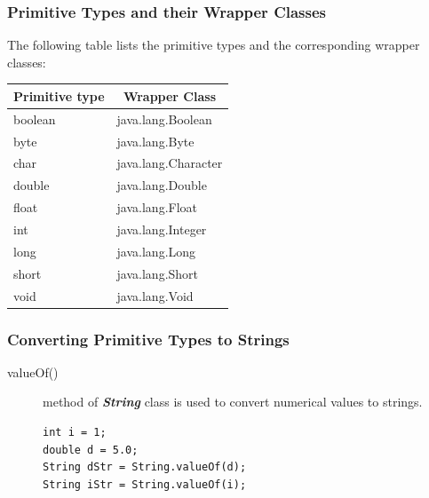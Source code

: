 \documentclass[11pt,a4paper]{article}
\begin{document}
\subsubsection*{Primitive Types and their Wrapper Classes}
The following table lists the primitive types and the corresponding wrapper classes:

\begin{table}[H]
\centering
\begin{tabular}{|p{3 cm}|p{5.5 cm}|}  \hline

\multicolumn{1}{|c|}{\textbf{Primitive type} } & \multicolumn{1}{|c|}{\textbf{Wrapper Class}} \\\hline
boolean & java.lang.Boolean \\ \hline
byte & java.lang.Byte \\ \hline
char & java.lang.Character \\ \hline
double & java.lang.Double \\ \hline
float & java.lang.Float \\ \hline
int & java.lang.Integer \\ \hline
long & java.lang.Long \\ \hline
short & java.lang.Short \\ \hline
void & java.lang.Void \\ \hline
 \end{tabular}
\end{table}


\subsubsection*{Converting Primitive Types to Strings}
\begin{description}
\item [valueOf()] method of \emph{\textbf{String}} class is used to convert numerical values to strings.
\begin{lstlisting}[numbers=none]
int i = 1;
double d = 5.0;
String dStr = String.valueOf(d);
String iStr = String.valueOf(i);
\end{lstlisting}
\end{description}
\end{document}
